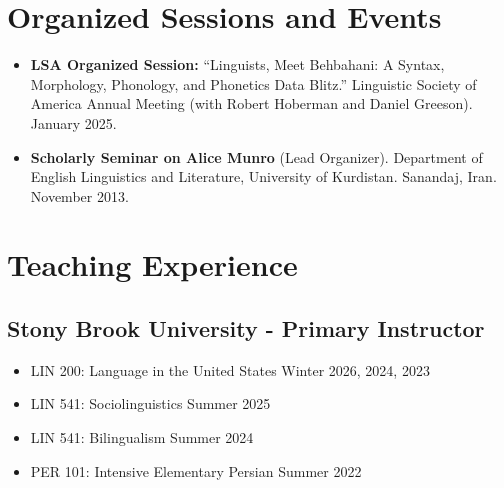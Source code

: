 \documentclass[a4paper,10pt]{article}
\begin{document}
\section*{Organized Sessions and Events}

\begin{itemize}

\item \textbf{LSA Organized Session:} 
``Linguists, Meet Behbahani: A Syntax, Morphology, Phonology, and Phonetics Data Blitz.'' 
Linguistic Society of America Annual Meeting (with Robert Hoberman and Daniel Greeson). 
January 2025.

\item \textbf{Scholarly Seminar on Alice Munro} (Lead Organizer).  
Department of English Linguistics and Literature, University of Kurdistan.  
Sanandaj, Iran. November 2013.

\end{itemize}

\section*{Teaching Experience}
\subsection*{Stony Brook University - Primary Instructor}
\begin{itemize}
   \item LIN 200: Language in the United States \hfill Winter 2026, 2024, 2023
    \item LIN 541: Sociolinguistics \hfill Summer 2025
    \item LIN 541: Bilingualism \hfill Summer 2024
    \item PER 101: Intensive Elementary Persian \hfill Summer 2022
\end{itemize}
\end{document}

